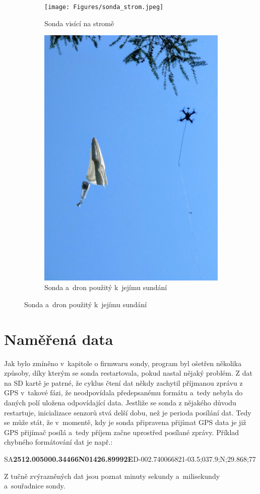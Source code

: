 \documentclass[twoside]{ctuthesis}
\theoremstyle{plain}
\theoremstyle{definition}
\theoremstyle{note}
\begin{document}
	\begin{figure}[hbtp]
		\centering
		\begin{subfigure}{.49\textwidth}
			\centering
			\texttt{[image: Figures/sonda\_strom.jpeg]}
			\caption{Sonda visící na stromě}
			\label{fig:sonda:strom}
		\end{subfigure}
		\begin{subfigure}{.49\textwidth}
			\centering
			\includegraphics[height=.8\textwidth]{Figures/sonda_dron.jpeg}
			\caption{Sonda a~dron použitý k~jejímu sundání}
			\label{fig:sonda:dron}			
		\end{subfigure}
	\end{figure}
	


	\section{Naměřená data}
	Jak bylo zmíněno v~kapitole o firmwaru sondy, program byl ošetřen několika způsoby, díky kterým se sonda restartovala, pokud nastal nějaký problém. Z dat na SD kartě je patrné, že cyklus čtení dat někdy zachytil příjmanou zprávu z GPS v~takové fázi, že neodpovídala předepsanému formátu a~tedy nebyla do daných polí uložena odpovídající data. Jestliže se sonda z nějakého důvodu restartuje, inicializace senzorů stvá delší dobu, než je perioda posílání dat. Tedy se může stát, že v~momentě, kdy je sonda připravena přijímat GPS data je již GPS přijímač posílá a~tedy příjem začne uprostřed posílané zprávy. Příklad chybného formátování dat je např.:
	\begin{center}
		SA\textbf{2512.00}\textbf{5000.34466N01426.89992E}D-002.740066821-03.5;037.9;N;29.868;77
	\end{center}
	Z tučně zvýrazněných dat jsou poznat minuty sekundy a~milisekundy a~souřadnice sondy.
\end{document}
